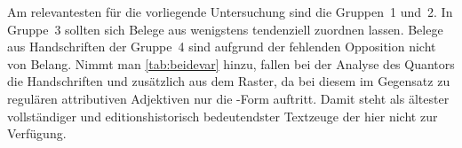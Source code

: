 Am relevantesten für die vorliegende Untersuchung sind die Gruppen~1 und~2. In
Gruppe~3 sollten sich Belege aus \citet{kc:VB} wenigstens tendenziell zuordnen
lassen. Belege aus Handschriften der Gruppe~4 sind aufgrund der fehlenden
Opposition nicht von Belang. Nimmt man \cref{tab:beidevar} hinzu, fallen bei
der Analyse des Quantors die Handschriften \cite{kc:A1} und \cite{kc:M}
zusätzlich aus dem Raster, da bei diesem im Gegensatz zu regulären attributiven
Adjektiven nur die -Form auftritt. Damit steht \citet{kc:A1} als
ältester vollständiger und editionshistorisch bedeutendster Textzeuge der
\KC{} hier nicht zur Verfügung.
